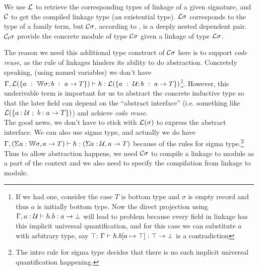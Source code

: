 We use ${\mathcal{L}}$ to retrieve the corresponding types of linkage of a given signature, and ${\mathcal{C}}$ to get the compiled linkage type (an existential type).
${\mathcal{L}}\sigma$ corresponds to the type of a family term, but ${\mathcal{C}}\sigma$, according to , is a deeply nested dependent pair. ${\mathcal{C}_t} \sigma$ provide the concrete module of type ${\mathcal{C}}\sigma$ given a linkage of type ${\mathcal{L}}\sigma$. 

The reason we need this additional type construct of ${\mathcal{C}}\sigma$ here is
to support \textit{code reuse}, as the rule of linkages hinders its
ability to do abstraction. Concretely speaking, (using named variables)
we don't have \\ ${ {\Gamma, {\mathcal{L}}(\{a~:~{\mathbb{W}} \sigma; b~:~a \to
T\})} \vdash {h} : {{\mathcal{L}}(\{a~:~{\mathcal{U}}; b~:~a \to T\})} }$\footnote{If we had one,
consider the case $T$ is bottom type and $\sigma$ is empty record and
thus $a$ is initially bottom type. Now the direct projection using
 ${ {\Gamma, a : {\mathcal{U}}} \vdash {h.b} : {a \to \bot} }$ will
lead to problem because every field in linkage has this implicit
universal quantification, and for this case we can substitute $a$ with
arbitrary type, say $\top$: ${ {\Gamma} \vdash {h.b[a \mapsto \top]} : {\top
\to \bot} }$ is a contradiction}.
However, this underivable term is important for us to abstract the
concrete inductive type so that the later field can depend on the
``abstract interface'' (i.e. something like ${\mathcal{L}}(\{a:{\mathcal{U}}~;~b:a \to T\})$) and achieve \textit{code reuse}. 
\\ The good news, we don't have to stick with ${\mathcal{L}}(\sigma)$ to express the abstract interface. We can also use sigma type, and actually 
we do have ${ {\Gamma, (\Sigma a : {\mathbb{W}}\sigma, a \to T)
} \vdash {h} : {(\Sigma a : {\mathcal{U}}, a \to T)} }$ because of the rules for sigma type.\footnote{The intro rule for sigma type decides that there is no such implicit universal quantification happening.}
Thus to allow abstraction happens, we need ${\mathcal{C}}\sigma$ to compile a
linkage to module as a part of the context and we also need
 to specify the compilation from linkage to
module.


